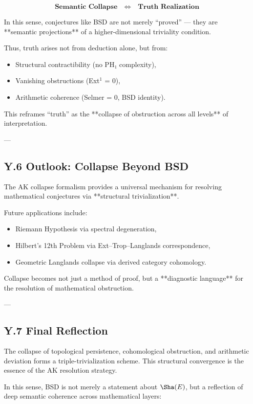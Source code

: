 \[
\textbf{Semantic Collapse} \quad \Longleftrightarrow \quad \textbf{Truth Realization}
\]

In this sense, conjectures like BSD are not merely “proved” —  
they are **semantic projections** of a higher-dimensional triviality condition.

Thus, truth arises not from deduction alone, but from:
\begin{itemize}
  \item Structural contractibility (no PH₁ complexity),
  \item Vanishing obstructions (Ext$^1$ = 0),
  \item Arithmetic coherence (Selmer = 0, BSD identity).
\end{itemize}

This reframes “truth” as the **collapse of obstruction across all levels** of interpretation.

---

\subsection*{Y.6 Outlook: Collapse Beyond BSD}

The AK collapse formalism provides a universal mechanism  
for resolving mathematical conjectures via **structural trivialization**.  

Future applications include:
\begin{itemize}
  \item Riemann Hypothesis via spectral degeneration,
  \item Hilbert’s 12th Problem via Ext–Trop–Langlands correspondence,
  \item Geometric Langlands collapse via derived category cohomology.
\end{itemize}

Collapse becomes not just a method of proof,  
but a **diagnostic language** for the resolution of mathematical obstruction.

---

\subsection*{Y.7 Final Reflection}

The collapse of topological persistence, cohomological obstruction,  
and arithmetic deviation forms a triple-trivialization scheme.  
This structural convergence is the essence of the AK resolution strategy.

In this sense, BSD is not merely a statement about \( \Sha(E) \),  
but a reflection of deep semantic coherence across mathematical layers:


